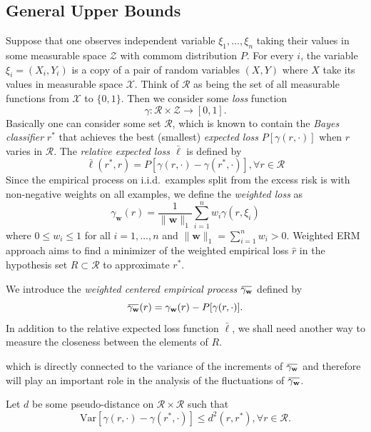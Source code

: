 \documentclass[letterpaper]{article} %
\def\LongVersion{}
\def\LongVersionEnd{}
\newcommand{\Pro}{P}
\newcommand{\Var}{\text{Var}}
\newcommand{\overbar}[1]{\mkern 1.5mu\overline{\mkern-1.5mu#1\mkern-1.5mu}\mkern 1.5mu}
\newcommand*\cen[1]{\overbar{#1}}
\newcommand{\weight}{\mathbf{w}}
\newcommand{\xspace}{\mathcal{X}}
\newcommand{\relossf}{\bar{\ell}}
\newcommand{\cenprocess}[1]{\cen{\gamma_{#1}}}
\newcommand{\normo}[1]{\|#1\|_1}
\begin{document}
\subsection{General Upper Bounds} %
\label{sub:i_i_d_}


Suppose that one observes independent variable $\xi_1,\dots,\xi_n$ taking their values in some measurable space $\mathcal Z$ with commom distribution $P$. 
For every $i$, the variable $\xi_i=(X_i,Y_i)$ is a copy of a pair of random variables $(X,Y)$ where $X$ take its values in measurable space $\xspace$. 
Think of $\mathcal{R}$ as being the set of all measurable functions from $\xspace$ to $\{0,1\}$. 
Then we consider some \emph{loss} function
\begin{equation}
    \label{eq:iid_loss}
    \gamma: \mathcal{R} \times \mathcal{Z} \to [0,1].
\end{equation}
Basically one can consider some set $\mathcal{R}$, which is known to contain the \emph{Bayes classifier} $r^*$ that achieves the best (smallest) \emph{expected loss} $P[\gamma(r,\cdot)]$ when $r$ varies in $\mathcal{R}$. The \emph{relative expected loss $\relossf$} is defined by
\begin{equation}
    \label{eq:iid_relative_expected_loss}
    \relossf(r^*,r) = \Pro[\gamma(r,\cdot)-\gamma(r^*,\cdot)], \forall r\in\mathcal{R}
\end{equation}
Since the empirical process on i.i.d.\ examples split from the excess risk is with non-negative weights on all examples, we define the \emph{weighted loss} as
\begin{equation}
    \label{eq:weighted_erm}
    \gamma_\weight(r) = \frac{1}{\normo{\weight{}}}\sum_{i=1}^n w_i\gamma(r,\xi_i)
\end{equation}
where $0\le w_i\le 1$ for all $i=1,\dots,n$ and $\normo{\weight{}}=\sum_{i=1}^n w_i> 0$. Weighted ERM approach aims to find a minimizer of the weighted empirical loss $\hat{r}$ in the hypothesis set $R\subset \mathcal{R}$ to approximate $r^*$.

We introduce the \emph{weighted centered empirical process} $\cenprocess{\weight}$ defined by
\begin{equation}
    \label{eq:centered_empirical_process}
    \cenprocess{\weight}(r) = \gamma_\weight(r)-\Pro[\gamma(r,\cdot)].
\end{equation}
In addition to the relative expected loss function $\relossf$, we shall need another way to measure the closeness between the elements of $R$.
\LongVersion
which is directly connected to the variance of the increments of $\cenprocess{\weight}$ and therefore will play an important role in the analysis of the fluctuations of $\cenprocess{\weight}$.
\LongVersionEnd
Let $d$ be some pseudo-distance on $\mathcal{R}\times\mathcal{R}$ such that
\begin{equation}
    \label{eq:variancD_Eistance_inequality}
    \Var[\gamma(r,\cdot)-\gamma(r^*,\cdot)]\le d^2(r,r^*), \forall r\in\mathcal{R}.
\end{equation}
\end{document}
